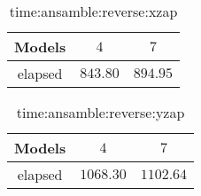 \begin{table}[!ht]
	\centering
	\begin{tabular}{|c|c|c|}
		\hline
		Models & $4$ & $7$ \\ \hline
		elapsed & $843.80$ & $894.95$ \\ \hline
	\end{tabular}
	\caption{time:ansamble:reverse:xzap}
	\label{tab:time:ansamble:reverse:xzap}
\end{table}

\begin{table}[!ht]
	\centering
	\begin{tabular}{|c|c|c|}
		\hline
		Models & $4$ & $7$ \\ \hline
		elapsed & $1068.30$ & $1102.64$ \\ \hline
	\end{tabular}
	\caption{time:ansamble:reverse:yzap}
	\label{tab:time:ansamble:reverse:yzap}
\end{table}
